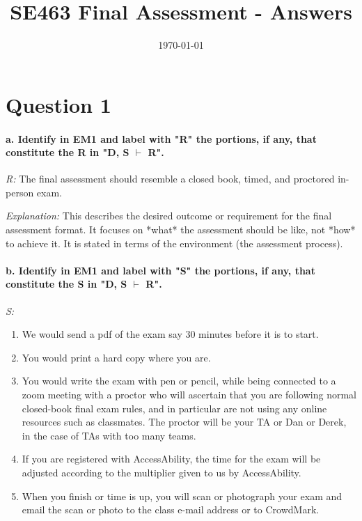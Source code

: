 \documentclass{article}
\title{SE463 Final Assessment - Answers}
\date{\today}
\begin{document}
\maketitle

\section*{Question 1}

\paragraph{a. Identify in EM1 and label with "R" the portions, if any, that constitute the R in "D, S $\vdash$ R".}

\textit{R:} The final assessment should resemble a closed book, timed, and proctored in-person exam.

\textit{Explanation:} This describes the desired outcome or requirement for the final assessment format. It focuses on *what* the assessment should be like, not *how* to achieve it. It is stated in terms of the environment (the assessment process).

\paragraph{b. Identify in EM1 and label with "S" the portions, if any, that constitute the S in "D, S $\vdash$ R".}

\textit{S:}
\begin{enumerate}
    \item We would send a pdf of the exam say 30 minutes before it is to start.
    \item You would print a hard copy where you are.
    \item You would write the exam with pen or pencil, while being connected to a zoom meeting with a proctor who will ascertain that you are following normal closed-book final exam rules, and in particular are not using any online resources such as classmates. The proctor will be your TA or Dan or Derek, in the case of TAs with too many teams.
    \item If you are registered with AccessAbility, the time for the exam will be adjusted according to the multiplier given to us by AccessAbility.
    \item When you finish or time is up, you will scan or photograph your exam and email the scan or photo to the class e-mail address or to CrowdMark.
\end{enumerate}
\end{document}
